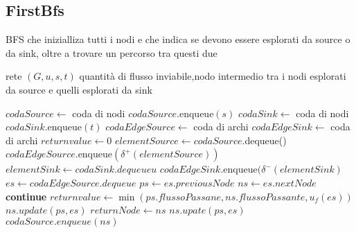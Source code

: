 \documentclass{article}
\begin{document}
\subsection{FirstBfs}
\begin{algorithm}
    \caption{BFS che inizialliza tutti i nodi e che indica se devono essere esplorati da source o da sink, oltre a trovare un percorso tra questi due}
    \begin{algorithmic}
        \REQUIRE rete $(G,u,s,t)$
        \ENSURE quantità di flusso inviabile,nodo intermedio tra i nodi esplorati da source e quelli esplorati da sink

        \STATE $codaSource \leftarrow $ coda di nodi
        \STATE $codaSource.$enqueue$(s)$
        \STATE $codaSink \leftarrow$ coda di nodi
        \STATE $codaSink.$enqueue$(t)$
        \STATE $codaEdgeSource \leftarrow$ coda di archi
        \STATE $codaEdgeSink \leftarrow$ coda di archi
        \STATE $returnvalue \leftarrow 0$
        \STATE $elementSource \leftarrow codaSource.$dequeue()
        \STATE $codaEdgeSource.$enqueue$(\delta^+(elementSource))$
        \ENDIF
        \STATE $elementSink \leftarrow codaSink.dequeueu$
        \STATE $codaEdgeSink.$enqueue$(\delta^-(elementSink)$
        \ENDIF
        \STATE $es \leftarrow codaEdgeSource.dequeue$
        \STATE $ps \leftarrow es.previousNode$
        \STATE $ns \leftarrow es.nextNode$
         
         
        \STATE \textbf{continue}
        \STATE $returnvalue \leftarrow \min(ps.flussoPassane,ns.flussoPassante,u_f(es))$
        \STATE $ns.update(ps,es)$
        \STATE $returnNode \leftarrow ns$
        \ENDIF
        \ELSE
        \STATE $ns.upate(ps,es)$
        \STATE $codaSource.enqueue(ns)$
        \ENDIF
        \ENDIF
    \end{algorithmic}
\end{algorithm}
\newpage
\end{document}
